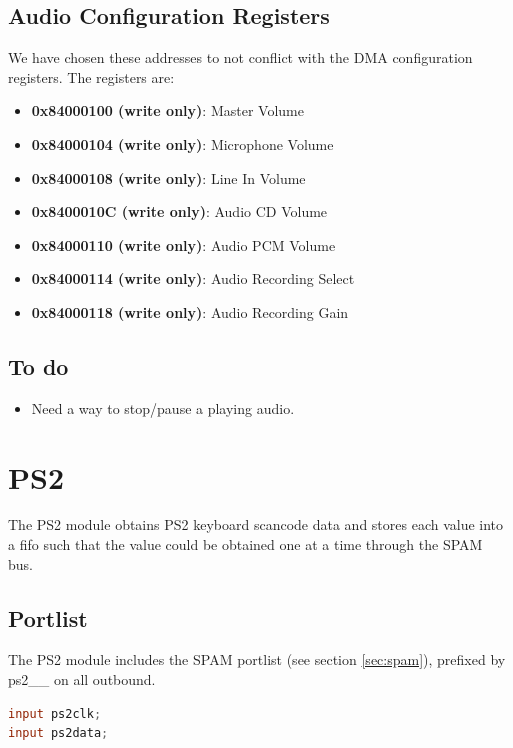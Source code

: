 \documentclass[10pt]{report}
\begin{document}
\subsection{Audio Configuration Registers}

We have chosen these addresses to not conflict with the DMA configuration
registers.  The registers are:

\begin{itemize}
\item{\textbf{0x84000100 (write only)}: Master Volume}
\item{\textbf{0x84000104 (write only)}: Microphone Volume}
\item{\textbf{0x84000108 (write only)}: Line In Volume}
\item{\textbf{0x8400010C (write only)}: Audio CD Volume}
\item{\textbf{0x84000110 (write only)}: Audio PCM Volume}
\item{\textbf{0x84000114 (write only)}: Audio Recording Select}
\item{\textbf{0x84000118 (write only)}: Audio Recording Gain}
\end{itemize}

\subsection{To do}

\begin{itemize}
\item{Need a way to stop/pause a playing audio.}
\end{itemize}

\section{PS2}
\label{sec:ps2}

The PS2 module obtains PS2 keyboard scancode data and stores each value into
a fifo such that the value could be obtained one at a time through the SPAM
bus.

\subsection{Portlist}

The PS2 module includes the SPAM portlist (see section \ref{sec:spam}),
prefixed by ps2\_\_ on all outbound.

\begin{lstlisting}[basicstyle=\footnotesize,language=Verilog]
input ps2clk;
input ps2data;
\end{lstlisting}
\end{document}
